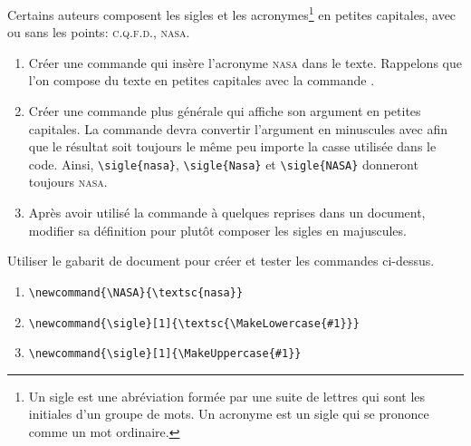 \begin{exercice}
  Certains auteurs composent les sigles et les acronymes\footnote{%
    Un sigle est une abréviation formée par une suite de lettres qui
    sont les initiales d'un groupe de mots. Un acronyme est un sigle
    qui se prononce comme un mot ordinaire.} %
  en petites capitales, avec ou sans les points: \textsc{c.q.f.d.},
  \textsc{nasa}.
  \begin{enumerate}
  \item Créer une commande \cmdprint{\NASA} qui insère l'acronyme
    \textsc{nasa} dans le texte. Rappelons que l'on compose du texte en petites
    capitales avec la commande \cmd{\textsc}.
  \item Créer une commande plus générale \cmdprint{\sigle} qui affiche
    son argument en petites capitales. La commande devra convertir
    l'argument en minuscules avec \cmd{\MakeLowercase} afin que le
    résultat soit toujours le même peu importe la casse utilisée dans
    le code. Ainsi, \lstinline=\sigle{nasa}=, \lstinline=\sigle{Nasa}= et
    \lstinline=\sigle{NASA}= donneront toujours
    \textsc{nasa}.
  \item Après avoir utilisé la commande \cmdprint{\sigle} à quelques
    reprises dans un document, modifier sa définition pour plutôt
    composer les sigles en majuscules.
  \end{enumerate}
  Utiliser le gabarit de document  pour
  créer et tester les commandes ci-dessus.
  \begin{sol}
    \begin{enumerate}
    \item \lstinline=\newcommand{\NASA}{\textsc{nasa}}=
    \item \lstinline=\newcommand{\sigle}[1]{\textsc{\MakeLowercase{#1}}}=
    \item \lstinline=\newcommand{\sigle}[1]{\MakeUppercase{#1}}=
    \end{enumerate}
  \end{sol}
\end{exercice}

